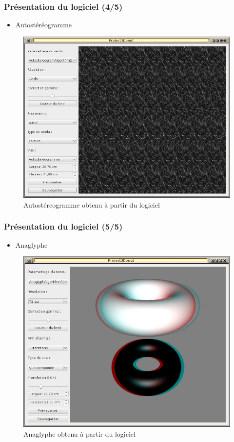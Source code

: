 \documentclass{beamer}
\begin{document}
%
\begin{frame}
\frametitle{Présentation du logiciel (4/5)}
\begin{itemize}[label=$\bullet$]
\item Autostéréogramme
\end{itemize}
\begin{figure}
\centering
\includegraphics[scale=0.28]{renduautostereogrammes.png}
\caption{Autostéreogramme obtenu à partir du logiciel}
\end{figure}
\end{frame}

%
\begin{frame}
\frametitle{Présentation du logiciel (5/5)}
\begin{itemize}[label=$\bullet$]
\item Anaglyphe
\end{itemize}
\begin{figure}
\centering
\includegraphics[scale=0.28]{renduanaglyphe.png}
\caption{Anaglyphe obtenu à partir du logiciel}
\end{figure}
\end{frame}
\end{document}
